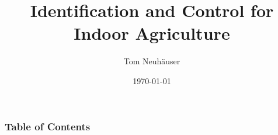 \documentclass{beamer}
\title{Identification and Control for Indoor Agriculture}
\author{Tom Neuh\"auser}
\date{\today}
\begin{document}
\frame{\titlepage}

\begin{frame}
    \frametitle{Table of Contents}
    \tableofcontents
\end{frame}






\end{document}
